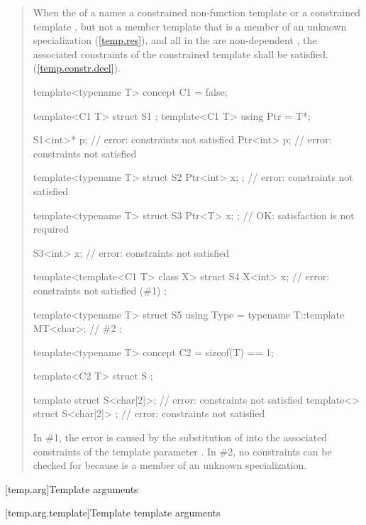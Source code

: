 \begin{quote}
\begin{addedblock}
\setcounter{Paras}{7}
\pnum
When the  of a  names
a constrained non-function template or a constrained template 
, but not a member template that is a member 
of an unknown specialization (\ref{temp.res}), and all 
 in the  
are non-dependent , the associated constraints of the 
constrained template shall be satisfied. (\ref{temp.constr.decl}).
% 
\enterexample
\begin{codeblock}
template<typename T> concept C1 = false;

template<C1 T> struct S1 { };
template<C1 T> using Ptr = T*;

S1<int>* p; // error: constraints not satisfied
Ptr<int> p; // error: constraints not satisfied

template<typename T>
  struct S2 { Ptr<int> x; }; // error: constraints not satisfied

template<typename T>
  struct S3 { Ptr<T> x; };   // OK: satisfaction is not required

S3<int> x;                   // error: constraints not satisfied

template<template<C1 T> class X>
  struct S4 {
    X<int> x; // error: constraints not satisfied (\#1)
  };

template<typename T>
  struct S5 {
    using Type = typename T::template MT<char>; // \#2
  };

template<typename T> concept C2 = sizeof(T) == 1;

template<C2 T> struct S { };

template struct S<char[2]>;       // error: constraints not satisfied
template<> struct S<char[2]> { }; // error: constraints not satisfied
\end{codeblock}
In \#1, the error is caused by the substitution of  into 
the associated constraints of the template parameter .
% 
In \#2, no constraints can be checked for  
because  is a member of an unknown specialization.
\exitexample
\end{addedblock}
\end{quote}

[temp.arg]{Template arguments}

\setcounter{subsection}{2}
[temp.arg.template]{Template template arguments}

